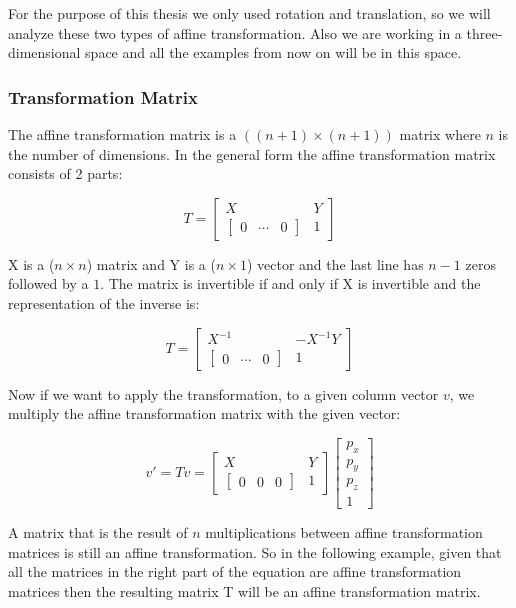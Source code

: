 For the purpose of this thesis we only used rotation and translation, so we will analyze these two types of affine transformation. Also we are working in a three-dimensional space and all the examples from now on will be in this space.

\subsubsection*{Transformation Matrix}
The affine transformation matrix is a \(\left(\left(n+1\right)\times \left(n+1\right)\right)\) matrix where \(n\) is the number of dimensions. In the general form the affine transformation matrix consists of 2 parts:

\[
T = 
\begin{bmatrix}
X & Y \\
\begin{bmatrix}
0 & \cdots & 0
\end{bmatrix} & 1
\end{bmatrix}
\]

X is a (\(n\times n\)) matrix and Y is a (\(n\times 1\)) vector and the last line has \(n-1\) zeros followed by a \(1\). The matrix is invertible if and only if X is invertible and the representation of the inverse is:

\[
T = 
\begin{bmatrix}
X^{-1} & -X^{-1}Y \\
\begin{bmatrix}
0 & \cdots & 0
\end{bmatrix} & 1
\end{bmatrix}
\]

Now if we want to apply the transformation, to a given column vector \(v\), we multiply the affine transformation matrix with the given vector:

\[
v' = Tv = 
\begin{bmatrix}
X & Y \\
\begin{bmatrix}
0 & 0 & 0
\end{bmatrix} & 1
\end{bmatrix}
\begin{bmatrix}
p_x\\
p_y\\
p_z\\
1
\end{bmatrix}
\]

A matrix that is the result of \(n\) multiplications between affine transformation matrices is still an affine transformation. So in the following example, given that all the matrices in the right part of the equation are affine transformation matrices then the resulting matrix T will be an affine transformation matrix.

